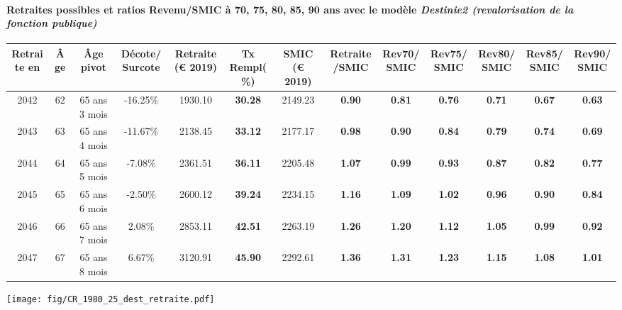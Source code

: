 \paragraph{Retraites possibles et ratios Revenu/SMIC à 70, 75, 80, 85, 90 ans avec le modèle \emph{Destinie2 (revalorisation de la fonction publique)}}  
 
{ \scriptsize \begin{center} 
\begin{tabular}[htb]{|c|c||c|c||c|c||c||c|c|c|c|c|c|} 
\hline 
 Retraite en &  Âge &  Âge pivot &  Décote/Surcote &  Retraite (\euro{} 2019) &  Tx Rempl(\%) &  SMIC (\euro{} 2019) &  Retraite/SMIC &  Rev70/SMIC &  Rev75/SMIC &  Rev80/SMIC &  Rev85/SMIC &  Rev90/SMIC \\ 
\hline \hline 
 2042 &  62 &  65 ans 3 mois &  -16.25\% &  1930.10 &  {\bf 30.28} &  2149.23 &  {\bf {\color{red} 0.90}} &  {\bf {\color{red} 0.81}} &  {\bf {\color{red} 0.76}} &  {\bf {\color{red} 0.71}} &  {\bf {\color{red} 0.67}} &  {\bf {\color{red} 0.63}} \\ 
\hline 
 2043 &  63 &  65 ans 4 mois &  -11.67\% &  2138.45 &  {\bf 33.12} &  2177.17 &  {\bf {\color{red} 0.98}} &  {\bf {\color{red} 0.90}} &  {\bf {\color{red} 0.84}} &  {\bf {\color{red} 0.79}} &  {\bf {\color{red} 0.74}} &  {\bf {\color{red} 0.69}} \\ 
\hline 
 2044 &  64 &  65 ans 5 mois &  -7.08\% &  2361.51 &  {\bf 36.11} &  2205.48 &  {\bf 1.07} &  {\bf {\color{red} 0.99}} &  {\bf {\color{red} 0.93}} &  {\bf {\color{red} 0.87}} &  {\bf {\color{red} 0.82}} &  {\bf {\color{red} 0.77}} \\ 
\hline 
 2045 &  65 &  65 ans 6 mois &  -2.50\% &  2600.12 &  {\bf 39.24} &  2234.15 &  {\bf 1.16} &  {\bf 1.09} &  {\bf 1.02} &  {\bf {\color{red} 0.96}} &  {\bf {\color{red} 0.90}} &  {\bf {\color{red} 0.84}} \\ 
\hline 
 2046 &  66 &  65 ans 7 mois &  2.08\% &  2853.11 &  {\bf 42.51} &  2263.19 &  {\bf 1.26} &  {\bf 1.20} &  {\bf 1.12} &  {\bf 1.05} &  {\bf {\color{red} 0.99}} &  {\bf {\color{red} 0.92}} \\ 
\hline 
 2047 &  67 &  65 ans 8 mois &  6.67\% &  3120.91 &  {\bf 45.90} &  2292.61 &  {\bf 1.36} &  {\bf 1.31} &  {\bf 1.23} &  {\bf 1.15} &  {\bf 1.08} &  {\bf 1.01} \\ 
\hline 
\hline 
\end{tabular} 
\end{center} } 

 \begin{center}\texttt{[image: fig/CR\_1980\_25\_dest\_retraite.pdf]}\end{center} \label{fig/CR_1980_25_dest_retraite.pdf} 

